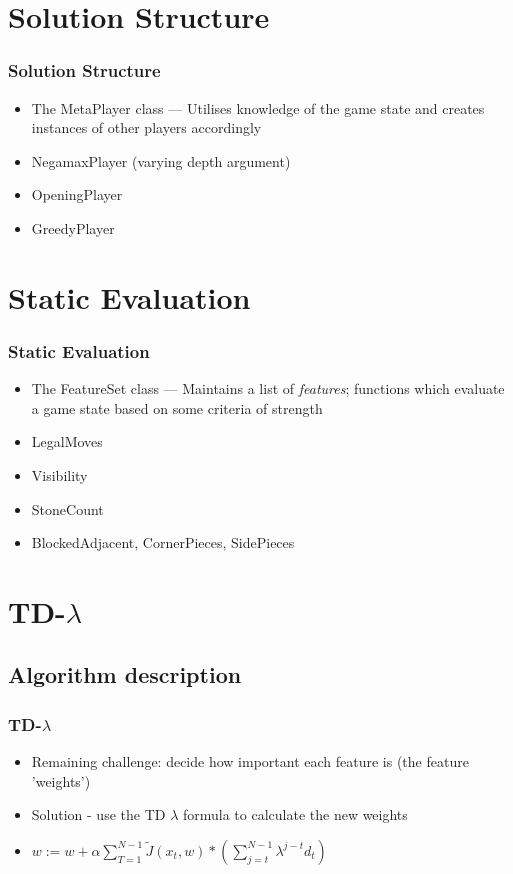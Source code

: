 \documentclass[10pt]{beamer}
\begin{document}
\section{Solution Structure}

\begin{frame}
  \frametitle{Solution Structure}   %
  \begin{itemize}
  \item<1-> The MetaPlayer class --- Utilises knowledge of the game state and 
        creates instances of other players accordingly
  \item<2-> NegamaxPlayer (varying depth argument)
  \item<2-> OpeningPlayer
  \item<2-> GreedyPlayer
  \end{itemize}
\end{frame}

\section{Static Evaluation}

\begin{frame}
  \frametitle{Static Evaluation}   %
  \begin{itemize}
  \item<1-> The FeatureSet class --- Maintains a list of \emph{features}; functions
  which evaluate a game state based on some criteria of strength
  \item<2-> LegalMoves
  \item<2-> Visibility
  \item<2-> StoneCount
  \item<2-> BlockedAdjacent, CornerPieces, SidePieces
  \end{itemize}
\end{frame}

\section{TD-$\lambda$}
\subsection{Algorithm description}
    \begin{frame}
      \frametitle{TD-$\lambda$}
      \begin{itemize}
        \item<1-> Remaining challenge: decide how important each feature is (the feature 'weights')
        \item<2-> Solution - use the TD $\lambda$ formula to calculate the new weights
        \item<2-> $\displaystyle w := w + \alpha \sum_{T=1}^{N-1} \tilde{J}(x_t,w) *( \sum _{j=t} ^{N-1} \lambda ^{j-t} d_t )$ 
      \end{itemize}
    \end{frame}
    
\end{document}

